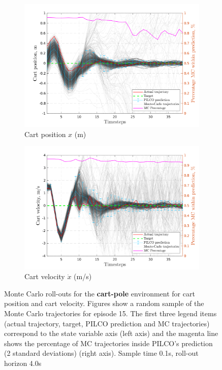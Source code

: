 \begin{figure}[htbp]    
   \begin{subfigure}[b]{1\linewidth}
    \centering
    \includegraphics[height=0.4\textheight,width=1\textwidth]{Chapter3/Figures/cp_MC_rollout_Ep_15_Dim_1.png} 
    \caption{Cart position $x$ (m)} 
    \label{Fig:Re-cp-cart-position} 
  \end{subfigure} 
  \begin{subfigure}[b]{1\linewidth}
    \centering
    \includegraphics[height=0.4\textheight,width=1\textwidth]{Chapter3/Figures/cp_MC_rollout_Ep_15_Dim_2.png} 
    \caption{Cart velocity $\dot x$ (m/s)} 
    \label{Fig:Re-cp-cart-velocity} 
  \end{subfigure} 
\caption[Monte Carlo roll-outs for \textbf{cart-pole} cart position and cart velocity]{Monte Carlo roll-outs for the \textbf{cart-pole} environment for cart position and cart velocity. Figures show a random sample of the Monte Carlo trajectories for episode 15. The first three legend items (actual trajectory, target, PILCO prediction and MC trajectories) correspond to the state variable axis (left axis) and the magenta line shows the percentage of MC trajectories inside PILCO's prediction (2 standard deviations) (right axis). Sample time 0.1s, roll-out horizon 4.0s}
\label{Fig:Re-cp-MC-roll-outs-1} 
\end{figure}
 
